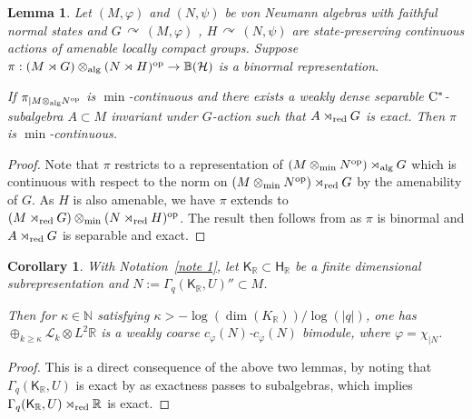 \documentclass[a4paper,11pt]{amsart}
\newtheorem{cor}[thm]{Corollary}
\newtheorem{lem}[thm]{Lemma}
\theoremstyle{definition}
\newcommand{\B}{{\mathbb B}}
\newcommand{\N}{{\mathbb N}}
\newcommand{\R}{{\mathbb R}}
\newcommand{\cH}{{\mathcal H}}
\newcommand{\cL}{{\mathcal L}}
\newcommand{\sH}{\mathsf{H}}
\newcommand{\sK}{\mathsf{K}}
\newcommand{\ot}{\otimes}
\newcommand{\op}{{\rm op}}
\newcommand{\alg}{{\operatorname{alg}}}
\newcommand{\actson}{{\, \curvearrowright \,}}
\begin{document}
\begin{lem}
Let $(M,\varphi)$ and $(N,\psi)$ be von Neumann algebras with faithful normal states
	and $G\actson (M,\varphi)$ , $H\actson (N,\psi)$ are state-preserving continuous actions of amenable locally compact groups.	
Suppose $\pi: (M\rtimes G)\ot_{\alg} (N\rtimes H)^{\op}\to \B(\cH)$ is a binormal representation.

If $\pi_{\mid M\otimes_{\alg} N^{\op}}$ is $\min$-continuous
	and there exists a weakly dense separable ${\rm C}^*$-subalgebra $A\subset M$ invariant under $G$-action
	such that $A\rtimes_{\rm red}G$ is exact.
Then $\pi$ is $\min$-continuous.
\end{lem}
\begin{proof}
Note that $\pi$ restricts to a representation of $(M\ot_{\min} N^{\op})\rtimes_{\alg} G$ which is continuous with respect to the norm on $(M\ot_{\rm min} N^{\op})\rtimes_{\rm red}G$ by the amenability of $G$.
As $H$ is also amenable, we have $\pi$ extends to  $(M\rtimes_{\rm red}G)\ot_{\min} (N\rtimes_{\rm red} H)^{\op}$.
The result then follows from \cite[Lemma 9.2.9]{BO08} as $\pi$ is binormal and $A\rtimes_{\rm red}G$ is separable and exact.
\end{proof}

\begin{cor}\label{cor: bound for coarse}
With Notation~\ref{note 1},
	let $\sK_\R\subset \sH_\R$ be a finite dimensional subrepresentation
	and $N:=\Gamma_q(\sK_\R, U)''\subset M$.
	
Then for $\kappa\in \N$ satisfying $\kappa>- \log(\dim(K_\R))/\log(|q|)$, one has
	$\oplus_{k\geq \kappa}\cL_k\ot L^2\R$ is a weakly coarse $c_\varphi(N)$-$c_\varphi(N)$ bimodule,
	where $\varphi=\chi_{\mid N}$.
\end{cor}
\begin{proof}
This is a direct consequence of the above two lemmas,  by noting that $\Gamma_q(\sK_\R, U)$ is exact by \cite{KN11}
	as exactness passes to subalgebras,
	which implies $\Gamma_q(\sK_\R, U)\rtimes_{\rm red}\R$ is exact.
\end{proof}
\end{document}
